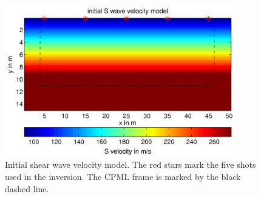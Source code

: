 \begin{figure}[ht]
\centering
\includegraphics[width=10cm]{figures/Rheinstetten/start_vs_model}
\caption{Initial shear wave velocity model. The red stars mark the five shots used in the inversion. The CPML frame is marked by the black dashed line.}
\label{Rheinstetten_initial_vs_model}
\end{figure}


